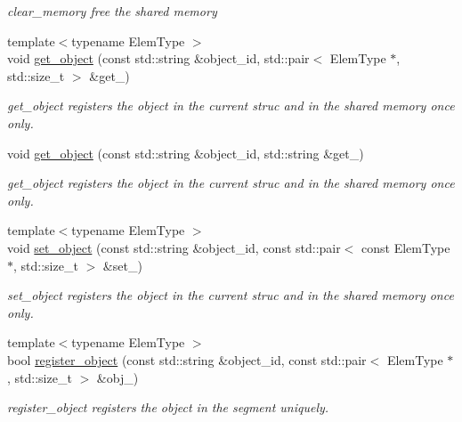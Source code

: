 \begin{DoxyCompactItemize}
\begin{DoxyCompactList}\small\item\em clear\+\_\+memory free the shared memory \end{DoxyCompactList}\item 
{\footnotesize template$<$typename Elem\+Type $>$ }\\void \hyperlink{classshared__memory_1_1SharedMemorySegment_ad73b5160f713c9a78e67c4b8590d8729}{get\+\_\+object} (const std\+::string \&object\+\_\+id, std\+::pair$<$ Elem\+Type $\ast$, std\+::size\+\_\+t $>$ \&get\+\_\+)
\begin{DoxyCompactList}\small\item\em get\+\_\+object registers the object in the current struc and in the shared memory once only. \end{DoxyCompactList}\item 
void \hyperlink{classshared__memory_1_1SharedMemorySegment_a17aa3bfe778e05b543415b1e5137a26b}{get\+\_\+object} (const std\+::string \&object\+\_\+id, std\+::string \&get\+\_\+)
\begin{DoxyCompactList}\small\item\em get\+\_\+object registers the object in the current struc and in the shared memory once only. \end{DoxyCompactList}\item 
{\footnotesize template$<$typename Elem\+Type $>$ }\\void \hyperlink{classshared__memory_1_1SharedMemorySegment_a16e6213d7dd1984799bbd8fbe14225dc}{set\+\_\+object} (const std\+::string \&object\+\_\+id, const std\+::pair$<$ const Elem\+Type $\ast$, std\+::size\+\_\+t $>$ \&set\+\_\+)
\begin{DoxyCompactList}\small\item\em set\+\_\+object registers the object in the current struc and in the shared memory once only. \end{DoxyCompactList}\item 
{\footnotesize template$<$typename Elem\+Type $>$ }\\bool \hyperlink{classshared__memory_1_1SharedMemorySegment_a6987e8225fd20dbab12e5bb3f5305b75}{register\+\_\+object} (const std\+::string \&object\+\_\+id, const std\+::pair$<$ Elem\+Type $\ast$, std\+::size\+\_\+t $>$ \&obj\+\_\+)
\begin{DoxyCompactList}\small\item\em register\+\_\+object registers the object in the segment uniquely. \end{DoxyCompactList}\item 

\end{DoxyCompactItemize}
